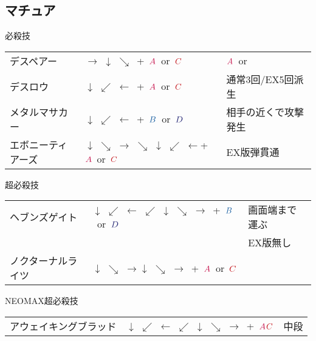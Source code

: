 \documentclass[a4j,11pt]{jarticle}
\def\A{$\textcolor{Acolor}{A}$}
\def\C{$\textcolor{Ccolor}{C}$}
\def\B{$\textcolor{Bcolor}{B}$}
\def\D{$\textcolor{Dcolor}{D}$}
\def\hado{$\downarrow$ $\searrow$ $\rightarrow$}%
\def\tatsu{$\downarrow$ $\swarrow$ $\leftarrow$}%
\def\syoryu{$\rightarrow$ $\downarrow$ $\searrow$}%
\def\ryuko{$\downarrow$ $\searrow$ $\rightarrow$ $\searrow$ $\downarrow$ $\swarrow$ $\leftarrow$}%
\def\orochi{$\downarrow$ $\swarrow$ $\leftarrow$ $\swarrow$ $\downarrow$ $\searrow$ $\rightarrow$}%
\begin{document}
\subsection{マチュア}
\begin{itembox}[l]{必殺技}
\begin{tabular}{lll}
デスペアー&\syoryu\ +\ \A\ or\ \C&\A\ or\ \\%
デスロウ&\tatsu\ +\ \A\ or\ \C&通常3回/EX5回派生\\%
メタルマサカー&\tatsu\ +\ \B\ or\ \D&相手の近くで攻撃発生\\%
エボニーティアーズ&\ryuko +\ \A\ or\ \C&EX版弾貫通%
\end{tabular}
\end{itembox}
\begin{itembox}[l]{超必殺技}
\begin{tabular}{lll}
ヘブンズゲイト&\orochi\ +\ \B\ or\ \D&画面端まで運ぶ\\
&&EX版無し\\ %
ノクターナルライツ&\hado\hado\ +\ \A\ or\ \C&%
\end{tabular}
\end{itembox}
\begin{itembox}[l]{NEOMAX超必殺技}
\begin{tabular}{lll}
アウェイキングブラッド&\orochi\ +\ \A\C&中段%
\end{tabular}
\end{itembox}
\newpage
\end{document}
